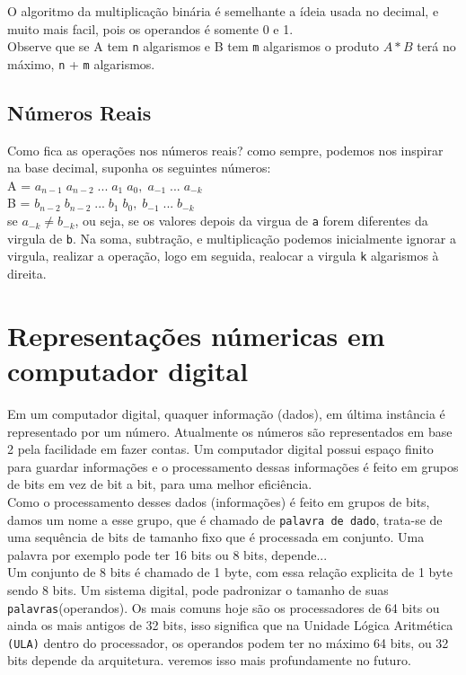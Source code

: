 \documentclass[12pt, onecolumn]{article}
\begin{document}
	O algoritmo da multiplicação binária é semelhante a ídeia usada no decimal, 
	e muito mais facil, pois os operandos é somente 0 e 1.\\
	\newline
	Observe que se A tem \texttt{n} algarismos e B tem \texttt{m} algarismos
	o produto $A * B$ terá no máximo, \texttt{n} + \texttt{m} algarismos.
	
	\subsection{\centering Números Reais}

	Como fica as operações nos números reais? como sempre, 
	podemos nos inspirar na	base decimal, suponha os seguintes números: \\
	\newline
	A = $a_{n-1}\;a_{n-2}\;...\;a_1\;a_0,\;a_{-1}\;...\;a_{-k}$ \\
	B = $b_{n-2}\;b_{n-2}\;...\;b_1\;b_0,\;b_{-1}\;...\;b_{-k}$ \\
	\newline
	se $a_{-k} \ne b_{-k}$, ou seja, se os valores depois da virgua 
	de \texttt{a} forem diferentes da virgula de \texttt{b}. 
	Na soma, subtração, e multiplicação podemos inicialmente ignorar a 
	virgula, realizar a operação, logo em seguida, realocar a 
	virgula \texttt{k} algarismos à direita.

	\section{\centering Representações númericas em computador digital}
	
	Em um computador digital, quaquer informação (dados), em última instância
	é representado por um número. Atualmente os números são representados 
	em base 2 pela facilidade em fazer contas. Um computador digital possui 
	espaço finito para guardar informações e o processamento dessas 
	informações é feito em grupos de bits em vez de bit a bit, 
	para uma melhor eficiência. \\
	\newline
	Como o processamento desses dados (informações) é feito em grupos de bits, 
	damos um nome a esse grupo, que é chamado de \texttt{palavra de dado}, 
	trata-se de uma	sequência de bits de tamanho fixo que é processada 
	em conjunto. Uma palavra por exemplo pode ter 16 bits ou 8 bits, 
	depende...\\
	\newline
	Um conjunto de 8 bits é chamado de 1 byte, com essa relação explicita de 
	1 byte sendo 8 bits. Um sistema digital, pode padronizar o tamanho de suas 
	\texttt{palavras}(operandos). Os mais comuns hoje são os processadores de 
	64 bits	ou ainda os mais antigos de 32 bits, isso significa que na 
	Unidade Lógica Aritmética \texttt{(ULA)} dentro do processador, 
	os operandos podem ter no máximo 64 bits, ou 32 bits depende da arquitetura. 
	veremos isso mais profundamente no futuro.\\
\end{document}

